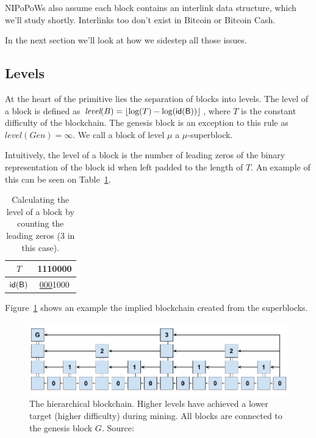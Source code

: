 NIPoPoWs also assume each block contains an interlink data structure, which we'll study shortly. Interlinks too don't exist in Bitcoin or Bitcoin Cash.

In the next section we'll look at how we sidestep all those issues.

\subsection{Levels}
At the heart of the primitive lies the separation of blocks into levels. The level of a block is defined as $\textit{level}(B) = \left \lfloor \log(T) - \log(\sf{id}(B)) \right \rfloor$, where $T$ is the constant difficulty of the blockchain. The genesis block is an exception to this rule as $\textit{level}(Gen) = \infty$. We call a block of level $\mu$ a $\mu$-superblock.

Intuitively, the level of a block is the number of leading zeros of the binary representation of the block id when left padded to the length of $T$. An example of this can be seen on Table~\ref{table:level-counting}.

\begin{table}
  \centering
  \begin{tabular}{|c|c|}
    \hline
    $T$ & 1110000 \\
    \hline
    $\sf{id}(B)$ & \underline{000}1000 \\
    \hline
  \end{tabular}
  \caption{Calculating the level of a block by counting the leading zeros (3 in this case).}
  \label{table:level-counting}
\end{table}

Figure~\ref{fig:hierarchy} shows an example the implied blockchain created from the superblocks.

\begin{figure}
  \centering
  \includegraphics[width=0.9\columnwidth,keepaspectratio]{figures/hierarchical-ledger.png}
  \caption{The hierarchical blockchain.  Higher levels have achieved a lower target (higher difficulty) during mining. All blocks are connected to the genesis block $G$. Source:~\cite{nipopows}}
  \label{fig:hierarchy}
\end{figure}

